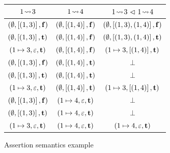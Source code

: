 \documentclass[11pt]{report}
\begin{document}

\begin{figure}[ht]
    \centering
    \begin{tabular}{c|c|c}
        $1 \fwriteu 3$ &  $1 \fwriteu 4$ & $1 \fwriteu 3 \fseq 1 \fwriteu 4$\\ \hline
        $(\nil,\llit{(1,3)},\bvf)$ & $(\nil,\llit{(1,4)},\bvf)$ & $(\nil,\llit{(1,3),(1,4)},\bvf)$\\ 
        $(\nil,\llit{(1,3)},\bvt)$ & $(\nil,\llit{(1,4)},\bvf)$ & $(\nil,\llit{(1,3),(1,4)},\bvt)$\\ 
        $(1 \mapsto 3,\lnil,\bvt)$ & $(\nil,\llit{(1,4)},\bvf)$ & $(1 \mapsto 3,\llit{(1,4)},\bvt)$\\ 
        $(\nil,\llit{(1,3)},\bvf)$ & $(\nil,\llit{(1,4)},\bvt)$ & $\bot$\\ 
        $(\nil,\llit{(1,3)},\bvt)$ & $(\nil,\llit{(1,4)},\bvt)$ & $\bot$\\ 
        $(1 \mapsto 3,\lnil,\bvt)$ & $(\nil,\llit{(1,4)},\bvt)$ & $(1 \mapsto 3,\llit{(1,4)},\bvt)$\\ 
        $(\nil,\llit{(1,3)},\bvf)$ & $(1 \mapsto 4,\lnil,\bvt)$ & $\bot$ \\
        $(\nil,\llit{(1,3)},\bvt)$ & $(1 \mapsto 4,\lnil,\bvt)$ & $\bot$ \\
        $(1 \mapsto 3,\lnil,\bvt)$ & $(1 \mapsto 4,\lnil,\bvt)$ & $(1 \mapsto 4,\lnil,\bvt)$\\ 
    \end{tabular}
    \caption{\label{fig:leads-to-seq-example}Assertion semantics example}
\end{figure}
\end{document}
